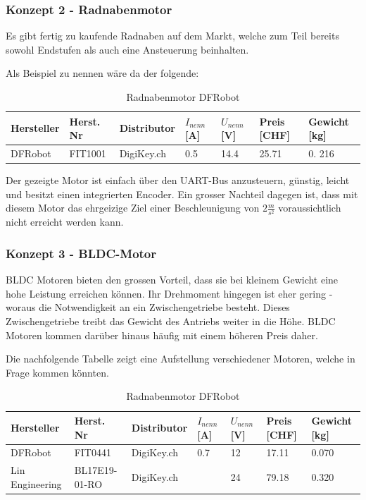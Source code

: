 \documentclass[main.tex]{subfiles} %
\begin{document}
\subsubsection*{Konzept 2 - Radnabenmotor} %

Es gibt fertig zu kaufende Radnaben auf dem Markt, welche zum Teil bereits
sowohl Endstufen als auch eine Ansteuerung beinhalten.

Als Beispiel zu nennen wäre da der folgende:

\begin{table}[h]
    \centering
    \begin{tabular}{|p{2cm}|p{3cm}|p{2cm}|p{1cm}|p{1cm}|p{1cm}|p{1.5cm}|}
        \hline
        Hersteller & Herst. Nr & Distributor & $I_{nenn} $ [A] & $U_{nenn}$ [V] & Preis [CHF] & Gewicht [kg] \\ \hline
        DFRobot    & FIT1001   & DigiKey.ch  & 0.5             & 14.4           & 25.71       & 0. 216       \\ \hline
    \end{tabular}
    \caption{Radnabenmotor DFRobot}
\end{table}

Der gezeigte Motor ist einfach über den UART-Bus anzusteuern, günstig, leicht
und besitzt einen integrierten Encoder. Ein grosser Nachteil dagegen ist, dass
mit diesem Motor das ehrgeizige Ziel einer Beschleunigung von $2 \frac{m}{s^2}$
voraussichtlich nicht erreicht werden kann.

\subsubsection*{Konzept 3 - BLDC-Motor} %

BLDC Motoren bieten den grossen Vorteil, dass sie bei kleinem Gewicht eine hohe
Leistung erreichen können. Ihr Drehmoment hingegen ist eher gering - woraus die
Notwendigkeit an ein Zwischengetriebe besteht. Dieses Zwischengetriebe treibt
das Gewicht des Antriebs weiter in die Höhe. BLDC Motoren kommen darüber hinaus
häufig mit einem höheren Preis daher.

Die nachfolgende Tabelle zeigt eine Aufstellung verschiedener Motoren, welche
in Frage kommen könnten.


\begin{table}[h]
    \centering
    \begin{tabular}{|p{2cm}|p{3cm}|p{2cm}|p{1cm}|p{1cm}|p{1cm}|p{1.5cm}|}
        \hline
        Hersteller      & Herst. Nr     & Distributor & $I_{nenn} $ [A] & $U_{nenn}$ [V] & Preis [CHF] & Gewicht [kg] \\ \hline
        DFRobot         & FIT0441       & DigiKey.ch  & 0.7             & 12             & 17.11       & 0.070        \\ \hline
        Lin Engineering & BL17E19-01-RO & DigiKey.ch  &                 & 24             & 79.18       & 0.320        \\ \hline
    \end{tabular}
    \caption{Radnabenmotor DFRobot}
\end{table}
\end{document}
